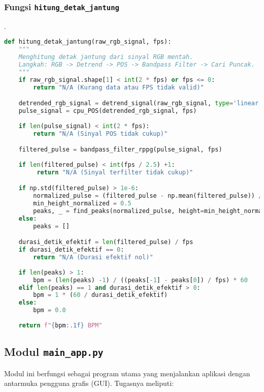 \documentclass[11pt,a4paper]{article}
\begin{document}
\subsubsection{Fungsi \texttt{hitung\_detak\_jantung}}.
     \begin{lstlisting}[language=Python, caption=Fungsi \texttt{hitung\_detak\_jantung},label={labelkode}]
    def hitung_detak_jantung(raw_rgb_signal, fps):
    """
    Menghitung detak jantung dari sinyal RGB mentah.
    Langkah: RGB -> Detrend -> POS -> Bandpass Filter -> Cari Puncak.
    """
    if raw_rgb_signal.shape[1] < int(2 * fps) or fps <= 0:
        return "N/A (Kurang data atau FPS tidak valid)"

    detrended_rgb_signal = detrend_signal(raw_rgb_signal, type='linear')
    pulse_signal = cpu_POS(detrended_rgb_signal, fps)
    
    if len(pulse_signal) < int(2 * fps):
        return "N/A (Sinyal POS tidak cukup)"

    filtered_pulse = bandpass_filter_rppg(pulse_signal, fps)
    
    if len(filtered_pulse) < int(fps / 2.5) +1:
         return "N/A (Sinyal terfilter tidak cukup)"

    if np.std(filtered_pulse) > 1e-6:
        normalized_pulse = (filtered_pulse - np.mean(filtered_pulse)) / np.std(filtered_pulse)
        min_height_normalized = 0.5
        peaks, _ = find_peaks(normalized_pulse, height=min_height_normalized, distance=fps / 2.5)
    else:
        peaks = []

    durasi_detik_efektif = len(filtered_pulse) / fps
    if durasi_detik_efektif == 0: 
        return "N/A (Durasi efektif nol)"
    
    if len(peaks) > 1:
        bpm = (len(peaks) -1) / ((peaks[-1] - peaks[0]) / fps) * 60
    elif len(peaks) == 1 and durasi_detik_efektif > 0:
        bpm = 1 * (60 / durasi_detik_efektif)
    else:
        bpm = 0.0
        
    return f"{bpm:.1f} BPM"
    \end{lstlisting}
    
\subsection{Modul \texttt{main\_app.py}}
     Modul ini berfungsi sebagai program utama yang menjalankan aplikasi dengan antarmuka pengguna grafis (GUI). Tugasnya meliputi:
\end{document}
